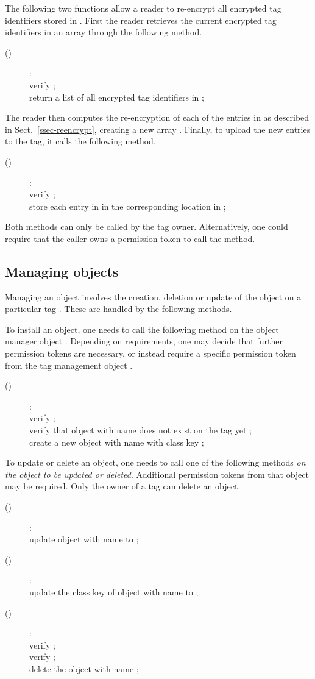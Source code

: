 The following two functions allow a reader to re-encrypt all encrypted tag
identifiers stored in . First the reader retrieves the current
encrypted tag identifiers in an array through the following method.
\begin{description}
\item[()]:\\
	verify  ; \\
	return a list of all encrypted tag identifiers in  ; 
\end{description}
The reader then computes the re-encryption of each of the entries in
 as described in Sect.~\ref{ssec-reencrypt}, creating a new array
. Finally, to upload the new entries to the tag, it calls the following
method. 
\begin{description}
\item[()]: \\
	verify  ; \\
	store each entry in  in the corresponding location in  ;
\end{description}
Both methods can only be called by the tag owner.
Alternatively, one could require that the caller owns a permission token to
call the method. 

\subsection{Managing objects}
\label{ssec-manage}

Managing an object involves the creation, deletion or update of the object on a
particular tag . These are handled by the following methods.

To install an object, one needs to call the following method on the object
manager object . Depending on requirements, one may decide that
further permission tokens are necessary, or instead require a specific
permission token from the tag management object .
\begin{description}
\item[()]:\\
	verify  ; \\
	verify that object with name  does not exist on the tag yet ; \\
	create a new object  with name  with class key  ;  
\end{description}
To update or delete an object, one needs to call one of the following methods
\emph{on the object to be updated or deleted}. Additional permission tokens 
from that
object may be required.
Only the owner of a tag can delete an object.
\begin{description}
\item[()]:\\
	update object with name  to  ; 
\item[()]:\\
	update the class key of object with name  to  ;  
\item[()]:\\
	verify  ; \\
	verify  ; \\
	delete the object with name  ; 
\end{description}


